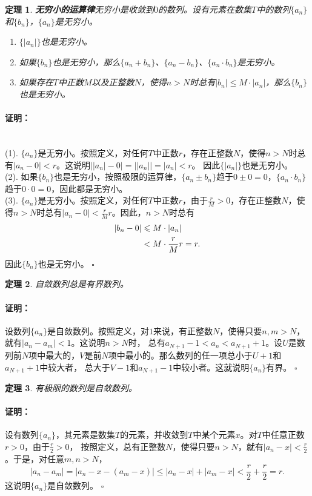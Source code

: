 \documentclass[12pt,UTF8]{ctexbook}
\newtheorem{tm}{定理}[section]
\newenvironment{proof2}{\paragraph{\textbf{证明：}}}{\hfill$\square$}
\begin{document}
\begin{appendix}
\begin{tm}{\textbf{无穷小的运算律}}\label{tm:a-0-50}
    无穷小是收敛到$0$的数列。设有元素在数集$T$中的数列$\{a_n\}$和$\{b_n\}$，$\{a_n\}$是无穷小。
    \begin{enumerate}
        \item $\{|a_n|\}$也是无穷小。
        \item 如果$\{b_n\}$也是无穷小，那么$\{a_n + b_n\}$、$\{a_n - b_n\}$、$\{a_n\cdot b_n\}$是无穷小。
        \item 如果存在$T$中正数$M$以及正整数$N$，使得$n>N$时总有$|b_n| \leqslant M\cdot |a_n|$，那么$\{b_n\}$也是无穷小。
    \end{enumerate}
\end{tm}
\begin{proof2}
    \mbox{} \\
    (1). $\{a_n\}$是无穷小。按照定义，对任何$T$中正数$r$，存在正整数$N$，使得$n>N$时总有$|a_n - 0| < r$。这说明$\big||a_n| - 0\big| = \big||a_n|\big| = |a_n| < r$。
    因此$\{|a_n|\}$也是无穷小。\\
    (2). 如果$\{b_n\}$也是无穷小，按照极限的运算律，$\{a_n \pm b_n\}$趋于$0 \pm 0 = 0$，$\{a_n \cdot b_n\}$趋于$0 \cdot 0 = 0$，因此都是无穷小。\\
    (3). $\{a_n\}$是无穷小。按照定义，对任何$T$中正数$r$，由于$\frac{r}{M} > 0$，存在正整数$N$，使得$n>N$时总有$|a_n - 0| < \frac{r}{M}r$。因此，$n>N$时总有
    \begin{align}
        |b_n - 0| &\leqslant M\cdot |a_n| \notag \\ 
        &< M\cdot \frac{r}{M}r = r.  \notag
    \end{align}
    因此$\{b_n\}$也是无穷小。
\end{proof2}

\begin{tm}\label{tm:a-0-60}
    自敛数列总是有界数列。
\end{tm}
\begin{proof2}
    设数列$\{a_n\}$是自敛数列。按照定义，对$1$来说，有正整数$N$，使得只要$n,m>N$，就有$|a_n - a_m| < 1$。这说明$n>N$时，
    总有$a_{N+1} - 1 < a_n < a_{N+1} + 1$。设$U$是数列前$N$项中最大的，$V$是前$N$项中最小的。那么数列的任一项总小于$U+1$和$a_{N+1}+1$中较大者，
    总大于$V-1$和$a_{N+1}-1$中较小者。这就说明$\{a_n\}$有界。
\end{proof2}

\begin{tm}\label{tm:a-0-70}
    有极限的数列是自敛数列。
\end{tm}
\begin{proof2}
    设有数列$\{a_n\}$，其元素是数集$T$的元素，并收敛到$T$中某个元素$x$。对$T$中任意正数$r>0$，由于$\frac{r}{2}>0$，
    按照定义，总有正整数$N$，使得只要$n>N$，就有$|a_n - x| < \frac{r}{2}$。于是，对任意$m,n>N$，
    $$ |a_n - a_m| = |a_n - x - (a_m - x)| \leqslant |a_n - x| + |a_m - x| < \frac{r}{2} + \frac{r}{2} = r.$$
    这说明$\{a_n\}$是自敛数列。
\end{proof2}


\end{appendix}
\end{document}
